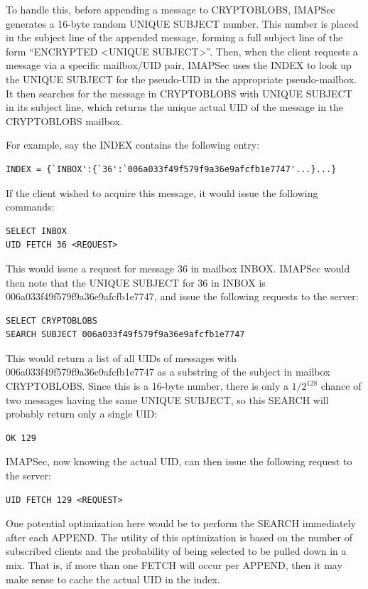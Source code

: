 \documentclass[pageno]{jpaper}
\newcommand{\project}{IMAPSec }
\newcommand{\projectnospace}{IMAPSec}
\begin{document}
To handle this, before appending a message to CRYPTOBLOBS, \project generates a 16-byte random UNIQUE SUBJECT number. This number is placed in the subject line of the appended message, forming a full subject line of the form ``ENCRYPTED <UNIQUE SUBJECT>''. Then, when the client requests a message via a specific mailbox/UID pair, \project uses the INDEX to look up the UNIQUE SUBJECT for the pseudo-UID in the appropriate pseudo-mailbox. It then searches for the message in CRYPTOBLOBS with UNIQUE SUBJECT in its subject line, which returns the unique actual UID of the message in the CRYPTOBLOBS mailbox.

For example, say the INDEX contains the following entry:

\begin{lstlisting}
INDEX = {`INBOX':{`36':`006a033f49f579f9a36e9afcfb1e7747'...}...}
\end{lstlisting}

If the client wished to acquire this message, it would issue the following commands:

\begin{lstlisting}
SELECT INBOX
UID FETCH 36 <REQUEST>
\end{lstlisting}

This would issue a request for message 36 in mailbox INBOX. \project would then note that
the UNIQUE SUBJECT for 36 in INBOX is 006a033f49f579f9a36e9afcfb1e7747, and issue the following requests to the server:

\begin{lstlisting}
SELECT CRYPTOBLOBS
SEARCH SUBJECT 006a033f49f579f9a36e9afcfb1e7747
\end{lstlisting}

This would return a list of all UIDs of messages with 006a033f49f579f9a36e9afcfb1e7747 as a substring of the subject in mailbox CRYPTOBLOBS. Since this is a 16-byte number, there is only a $1/2^{128}$ chance of two messages having the same UNIQUE SUBJECT, so this SEARCH will probably return only a single UID:

\begin{lstlisting}
OK 129
\end{lstlisting}


\projectnospace, now knowing the actual UID, can then issue the following request to the server:

\begin{lstlisting}
UID FETCH 129 <REQUEST>
\end{lstlisting}

One potential optimization here would be to perform the SEARCH immediately after each APPEND. The utility of this optimization is based on the number of subscribed clients and the probability of being selected to be pulled down in a mix. That is, if more than one FETCH will occur per APPEND, then it may make sense to cache the actual UID in the index.
\end{document}
